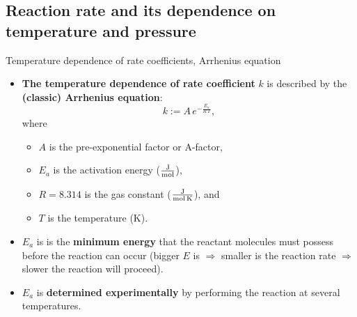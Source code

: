 \subsection{Reaction rate and its dependence on temperature and pressure}
\begin{frame}{Temperature dependence of rate coefficients, Arrhenius equation}
	\begin{itemize}
		\item {\bf The temperature dependence of rate coefficient} $k$ is	described by the \alert{\bf (classic) Arrhenius equation}:
		\[
		k := A\, e^{-\tfrac{E_a}{R\, T}},\]
		where 
		\begin{itemize}
			\item $A$ is the pre-exponential factor or A-factor,
			\item $E_a$ is the activation energy ($\tfrac{\rm J}{\rm mol}$), 
			\item $R = 8.314$ is the gas constant ($\tfrac{\rm J}{\rm mol \, K}$), and 
			\item $T$ is the temperature (K).
		\end{itemize}
		\pause
		\item $E_a$ is is the {\bf minimum energy} that the reactant molecules must possess before the reaction can occur (bigger $E$ is $\Rightarrow$ smaller is the reaction rate $\Rightarrow$ slower the reaction will proceed).
		\pause
		\item $E_a$ is {\bf determined experimentally} by performing the reaction at several temperatures. 
	\end{itemize}
\end{frame}
%
%
%
